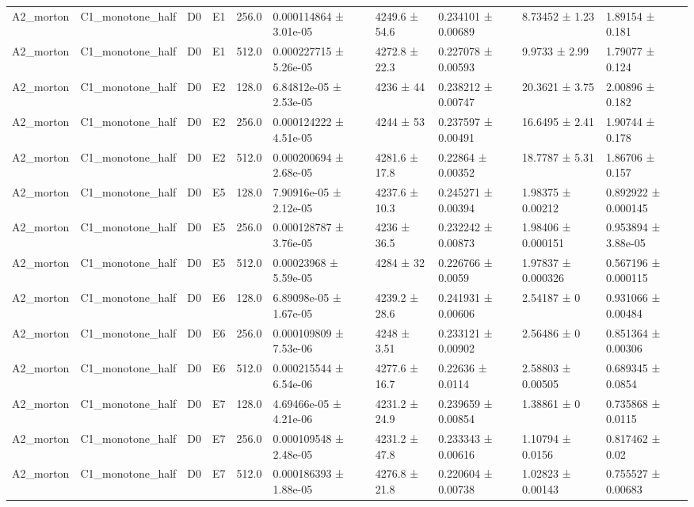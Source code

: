 \begin{table}
\begin{tabular}{llllllllll}
A2\_morton & C1\_monotone\_half & D0 & E1 & 256.0 & 0.000114864 ± 3.01e-05 & 4249.6 ± 54.6 & 0.234101 ± 0.00689 & 8.73452 ± 1.23 & 1.89154 ± 0.181 \\
A2\_morton & C1\_monotone\_half & D0 & E1 & 512.0 & 0.000227715 ± 5.26e-05 & 4272.8 ± 22.3 & 0.227078 ± 0.00593 & 9.9733 ± 2.99 & 1.79077 ± 0.124 \\
A2\_morton & C1\_monotone\_half & D0 & E2 & 128.0 & 6.84812e-05 ± 2.53e-05 & 4236 ± 44 & 0.238212 ± 0.00747 & 20.3621 ± 3.75 & 2.00896 ± 0.182 \\
A2\_morton & C1\_monotone\_half & D0 & E2 & 256.0 & 0.000124222 ± 4.51e-05 & 4244 ± 53 & 0.237597 ± 0.00491 & 16.6495 ± 2.41 & 1.90744 ± 0.178 \\
A2\_morton & C1\_monotone\_half & D0 & E2 & 512.0 & 0.000200694 ± 2.68e-05 & 4281.6 ± 17.8 & 0.22864 ± 0.00352 & 18.7787 ± 5.31 & 1.86706 ± 0.157 \\
A2\_morton & C1\_monotone\_half & D0 & E5 & 128.0 & 7.90916e-05 ± 2.12e-05 & 4237.6 ± 10.3 & 0.245271 ± 0.00394 & 1.98375 ± 0.00212 & 0.892922 ± 0.000145 \\
A2\_morton & C1\_monotone\_half & D0 & E5 & 256.0 & 0.000128787 ± 3.76e-05 & 4236 ± 36.5 & 0.232242 ± 0.00873 & 1.98406 ± 0.000151 & 0.953894 ± 3.88e-05 \\
A2\_morton & C1\_monotone\_half & D0 & E5 & 512.0 & 0.00023968 ± 5.59e-05 & 4284 ± 32 & 0.226766 ± 0.0059 & 1.97837 ± 0.000326 & 0.567196 ± 0.000115 \\
A2\_morton & C1\_monotone\_half & D0 & E6 & 128.0 & 6.89098e-05 ± 1.67e-05 & 4239.2 ± 28.6 & 0.241931 ± 0.00606 & 2.54187 ± 0 & 0.931066 ± 0.00484 \\
A2\_morton & C1\_monotone\_half & D0 & E6 & 256.0 & 0.000109809 ± 7.53e-06 & 4248 ± 3.51 & 0.233121 ± 0.00902 & 2.56486 ± 0 & 0.851364 ± 0.00306 \\
A2\_morton & C1\_monotone\_half & D0 & E6 & 512.0 & 0.000215544 ± 6.54e-06 & 4277.6 ± 16.7 & 0.22636 ± 0.0114 & 2.58803 ± 0.00505 & 0.689345 ± 0.0854 \\
A2\_morton & C1\_monotone\_half & D0 & E7 & 128.0 & 4.69466e-05 ± 4.21e-06 & 4231.2 ± 24.9 & 0.239659 ± 0.00854 & 1.38861 ± 0 & 0.735868 ± 0.0115 \\
A2\_morton & C1\_monotone\_half & D0 & E7 & 256.0 & 0.000109548 ± 2.48e-05 & 4231.2 ± 47.8 & 0.233343 ± 0.00616 & 1.10794 ± 0.0156 & 0.817462 ± 0.02 \\
A2\_morton & C1\_monotone\_half & D0 & E7 & 512.0 & 0.000186393 ± 1.88e-05 & 4276.8 ± 21.8 & 0.220604 ± 0.00738 & 1.02823 ± 0.00143 & 0.755527 ± 0.00683 \\

\end{tabular}
\end{table}
